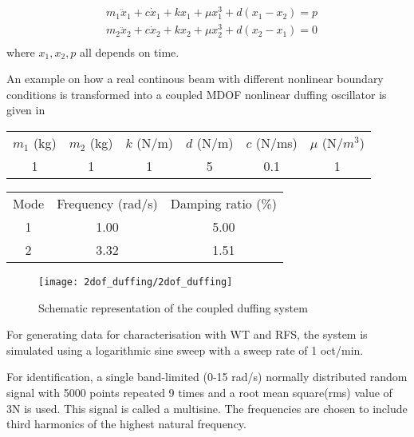 \begin{equation}
  \label{eq:2dof}
  \begin{aligned}
    &m_1\ddot x_1 + c \dot x_1 + kx_1 + \mu x_1^3 + d(x_1 - x_2) = p \\
    &m_2\ddot x_2 + c \dot x_2 + kx_2 + \mu x_2^3 + d(x_2 - x_1) = 0 \\
  \end{aligned}
\end{equation}
where $x_1,x_2, p$ all depends on time.

An example on how a real continous beam with different nonlinear boundary
conditions is transformed into a coupled MDOF nonlinear duffing oscillator is
given in \textcite{mhermansen2017a}


\begin{center}
  \begin{tabular}{*{6}{c}}
    \hline
    $m_1$ (kg) & $m_2$ (kg) & $k$ (N/m) & $d$ (N/m) & $c$ (N/ms) & $\mu$ (N/$m^3$) \\
    1 & 1 & 1 & 5 & 0.1 & 1 \\
    \hline
  \end{tabular}
  \label{tab:duf_par}
\end{center}


\begin{center}
  \begin{tabular}{*{3}{c}}
    \hline
    Mode & Frequency (rad/s) & Damping ratio (\%) \\
    1 & 1.00 & 5.00 \\
    2 & 3.32 & 1.51 \\
    \hline
  \end{tabular}
  \label{tab:duf_eigen}
\end{center}


\begin{figure}[!ht]
  \centering
  \texttt{[image: 2dof\_duffing/2dof\_duffing]}
  \caption{Schematic representation of the coupled duffing system}
  \label{fig:duf_schematic}
\end{figure}

For generating data for characterisation with WT and RFS, the system is
simulated using a logarithmic sine sweep with a sweep rate of 1 oct/min.

For identification, a single band-limited (0-15 rad/s) normally distributed
random signal with 5000 points repeated 9 times and a root mean square(rms)
value of 3N is used. This signal is called a multisine. The frequencies are
chosen to include third harmonics of the highest natural frequency.

